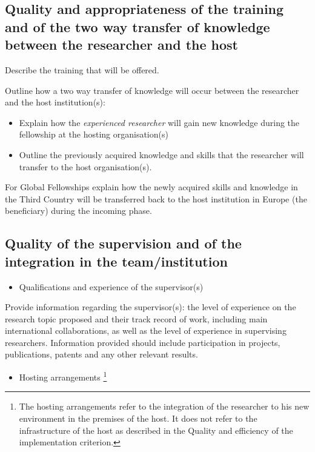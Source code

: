 \subsection{Quality and appropriateness of the training and of the two way transfer of knowledge between the researcher and the host}
\label{sec:excellence_transfer}

Describe the training that will be offered.

\noindent
Outline how a two way transfer of knowledge will occur between the researcher and the host institution(s):
\begin{itemize}
\item Explain how the \emph{experienced researcher} will gain new knowledge during the fellowship at the hosting organisation(s)
\item Outline the previously acquired knowledge and skills that the researcher will transfer to the host organisation(s).
\end{itemize}

For Global Fellowships explain how the newly acquired skills and knowledge in the Third Country will be transferred back to the host institution in Europe (the beneficiary) during the incoming phase.




\subsection{Quality of the supervision and of the integration in the team/institution}
\label{sec:excellence_supervision}

\begin{itemize}
  \item Qualifications and experience of the supervisor(s)
\end{itemize}

\noindent
Provide information regarding the supervisor(s): 
the level of experience on the research topic proposed and their track record of work, 
including main international collaborations, 
as well as the level of experience in supervising researchers.
Information provided should include participation in projects, publications, patents and any other relevant results.

\begin{itemize}
  \item Hosting arrangements%
\footnote{The hosting arrangements refer to the integration of the researcher to his new environment in the premises of the host. 
It does not refer to the infrastructure of the host as described in the Quality and efficiency of the implementation criterion.}
\end{itemize}

